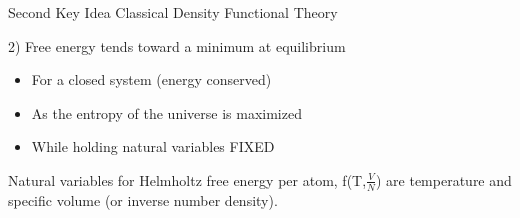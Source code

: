 \documentclass{beamer}
\renewcommand{\vec}[1]{\mathbf{#1}}
\begin{document}
\begin{frame}{Second Key Idea Classical Density Functional Theory}
    \begin{block}{2) Free energy tends toward a minimum at equilibrium }
    \begin{itemize}
       \item For a closed system (energy conserved)
       \item As the entropy of the universe is maximized
       \item While holding natural variables FIXED
    \end{itemize}
    
       Natural variables for Helmholtz free energy per atom,          %
       f(T,$\frac{V}{N}$) are temperature and specific volume (or inverse number density). 
     \end{block}     
\end{frame}
\end{document}
